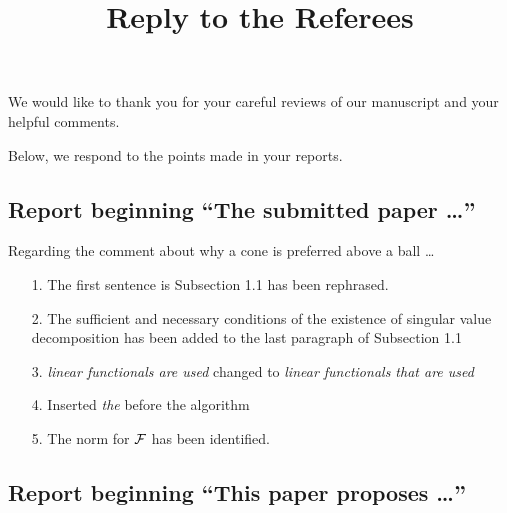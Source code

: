 \documentclass[letter]{article}
\begin{document}
\title{Reply to the Referees}
\maketitle

\noindent We would like to thank you for your careful reviews of our manuscript and your helpful comments. 

\noindent Below, we respond to the points made in your reports.

\subsection*{Report beginning ``The submitted paper \ldots''}

Regarding the comment about why a cone is preferred above a ball \ldots

\begin{enumerate}
    \item[1.] The first sentence is Subsection 1.1 has been rephrased.
    \item[2.] The sufficient and necessary conditions of the existence of singular value decomposition has been added  to  the last paragraph of Subsection 1.1
    \item[3.] \textit{linear functionals are used} changed to 
    \textit{linear functionals that are used}
    \item[4.] Inserted \textit{the} before the algorithm
    \item[5.] The norm for ${\mathcal{F}}$ has been identified.
\end{enumerate}


\subsection*{Report beginning ``This paper proposes \ldots''}
\end{document}
